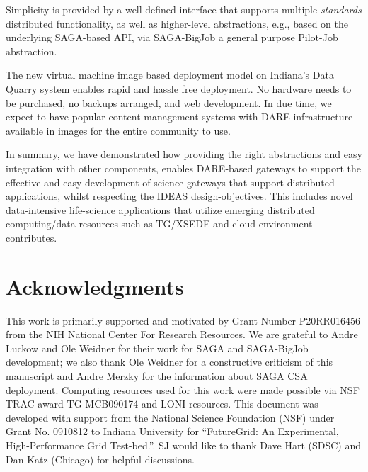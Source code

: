 \documentclass[]{svjour3}
\begin{document}
Simplicity is provided by a well defined interface that supports
multiple {\it standards} distributed functionality, as well as
higher-level abstractions, e.g., based on the underlying SAGA-based
API, via SAGA-BigJob a general purpose Pilot-Job abstraction.

The new virtual machine image based deployment model on Indiana's Data
Quarry system enables rapid and hassle free deployment. No hardware
needs to be purchased, no backups arranged, and web development. In
due time, we expect to have popular content management systems with
DARE infrastructure available in images for the entire community to use.

In summary, we have demonstrated how providing the right abstractions
and easy integration with other components, enables DARE-based
gateways to support the effective and easy development of science
gateways that support distributed applications, whilst respecting the
IDEAS design-objectives. This includes novel data-intensive
life-science applications that utilize emerging distributed
computing/data resources such as TG/XSEDE and cloud environment
contributes.



\section{Acknowledgments}
This work is primarily supported and motivated by Grant Number
P20RR016456 from the NIH National Center For Research Resources. We
are grateful to Andre Luckow and Ole Weidner for their work for SAGA
and SAGA-BigJob development; we also thank Ole Weidner for a
constructive criticism of this manuscript and Andre Merzky for the information about SAGA CSA deployment. Computing resources used for this work were made possible via NSF TRAC award TG-MCB090174 and
LONI resources. This document was developed with support from the
National Science Foundation (NSF) under Grant No. 0910812 to Indiana
University for ``FutureGrid: An Experimental, High-Performance Grid
Test-bed.''. SJ would like to thank Dave Hart (SDSC) and Dan Katz
(Chicago) for helpful discussions.



%

%

\end{document}
